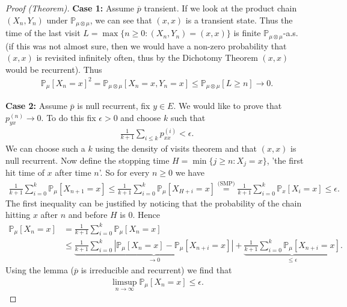 \begin{proof}[Proof (Theorem)]
	\textbf{Case 1:} Assume $\overline{p}$ transient. If we look at the product chain $(X_n, Y_n)$ under $\mathbb{P}_{\mu \otimes \mu}$, we can see that $(x,x)$ is a transient state. Thus the time of the last visit  $L = \max\{n\geq 0: (X_n, Y_n) = (x,x) \}$ is finite $\mathbb{P}_{\mu \otimes \mu}$-a.s. (if this was not almost sure, then we would have a non-zero probability that $(x,x)$ is revisited infinitely often, thus by the Dichotomy Theorem $(x,x)$ would be recurrent). Thus
\begin{align}
	\mathbb{P}_{\mu } \left[ X_n = x \right]^2 = \mathbb{P}_{\mu \otimes \mu} \left[ X_n =x, Y_n=x \right] \leq \mathbb{P}_{\mu \otimes \mu } \left[ L \geq n \right] \to 0.
\end{align}

\textbf{Case 2:} Assume $\overline{p}$ is null recurrent, fix  $y \in E$. We would like to prove that $p_{yx}^{(n)} \to 0$. To do this fix $\epsilon > 0$ and choose $k$ such that
\begin{align}
	\frac{1}{k+1} \sum_{i\leq k}^{} p_{xx}^{(i)} < \epsilon.
\end{align}
We can choose such a $k$ using the density of visits theorem and that $(x,x)$ is null recurrent. Now define the stopping time $H = \min\{j \geq n: X_j = x\}$, 'the first hit time of $x$ after time $n$'. So for every $n\geq 0$ we have
\begin{align}
	\frac{1}{k+1} \sum_{i=0}^{k} \mathbb{P}_{\mu } \left[ X_{n+1}=x \right]  \leq \frac{1}{k+1} \sum_{i=0}^{k} \mathbb{P}_{\mu } \left[ X_{H+i}=x \right]  
	\stackrel{\textrm{(SMP)}}{=} \frac{1}{k+1} \sum_{i=0}^{k} \mathbb{P}_{x} \left[ X_i =x \right]  \leq \epsilon.
\end{align}
The first inequality can be justified by noticing that the probability of the chain hitting $x$ after $n$ and before $ H$ is 0. Hence
\begin{align}
	\mathbb{P}_{\mu } \left[ X_n = x \right] &= \frac{1}{k+1} \sum_{i=0}^{k} \mathbb{P}_{\mu } \left[ X_n = x \right] \\
						 &\leq \underbrace{\frac{1}{k+1}\sum_{i=0}^{k} \left| \mathbb{P}_{\mu } \left[ X_n = x \right] - \mathbb{P}_{\mu } \left[ X_{n+i} = x \right] \right|}_{\to 0} + \underbrace{\frac{1}{k+1} \sum_{i=0}^{k} \mathbb{P}_{\mu } \left[ X_{n+i}=x \right]}_{\leq \epsilon} 
.\end{align}
Using the lemma ($\overline{p}$ is irreducible and recurrent) we find that
\begin{align}
	\limsup_{n\to\infty} \mathbb{P}_{\mu } \left[ X_n = x \right] \leq \epsilon.
\end{align}


	
\end{proof}



